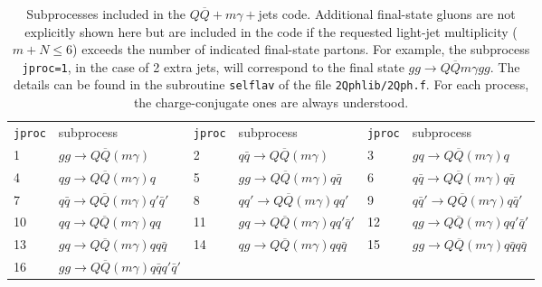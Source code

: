 \documentclass[paper]{JHEP3}
\newcommand{\ccaption}[2]{
    \begin{center}
    \parbox{0.85\textwidth}{
      \caption[#1]{\small{{#2}}}
      }
    \end{center}
    }
\def    \qbar   {\bar{q}}
\def    \Qbar   {\overline{Q}}
\begin{document}
\begin{table}
\begin{center}
\begin{tabular}{ll|ll|ll}
{\tt jproc} & subprocess & {\tt jproc} & subprocess & {\tt jproc} &
subprocess \\ 
1 &  $g g \to  Q\Qbar (m\gamma)$ 
&2 &  $q \qbar \to Q\Qbar (m\gamma)$ 
&3 &  $g q \to  Q\Qbar (m\gamma) q$ 
\\
4 &  $ q g \to Q\Qbar (m\gamma) q$ 
&5 &  $g g  \to  Q \Qbar (m\gamma) q \qbar$ 
&6 &  $q \qbar  \to Q \Qbar (m\gamma) q \qbar$ 
\\
7 &  $q \qbar \to Q \Qbar (m\gamma) q' \qbar'$ 
&8 &  $q q' \to Q \Qbar (m\gamma) q q'$ 
&9 &  $q\qbar' \to  Q \Qbar (m\gamma) q \qbar'$ 
\\
10 &  $q q\to Q \Qbar (m\gamma) q q$ 
&11 &  $g q \to Q \Qbar (m\gamma) q q'\qbar'$ 
&12 &  $q g  \to  Q \Qbar (m\gamma) q q' \qbar'$ 
\\
13 &  $g q \to  Q \Qbar (m\gamma) q q \qbar$ 
&14 &  $q g \to Q \Qbar (m\gamma) q q \qbar $ 
&15 &  $g g \to  Q \Qbar (m\gamma) q \qbar q \qbar$ 
\\
16 &  $g g \to  Q \Qbar (m\gamma) q \qbar q' \qbar'$ 
& &  
& &
\end{tabular}
\ccaption{}{\label{tab:2Qph} Subprocesses included in the $Q\Qbar+m\gamma+$jets
  code. Additional final-state gluons are not explicitly 
  shown here but are included in the code if the requested light-jet
  multiplicity ($m+N\le 6$) exceeds the number of indicated final-state 
  partons. For example, the subprocess {\tt jproc=1},
  in the case of 2 extra jets, will correspond to the final state  
  $gg\to Q\Qbar m\gamma g g$.
  The details can be found in the subroutine {\tt selflav} of
  the file {\tt 2Qphlib/2Qph.f}. For each process, the charge-conjugate 
  ones are always understood.}
\end{center}
\end{table}
\end{document}
